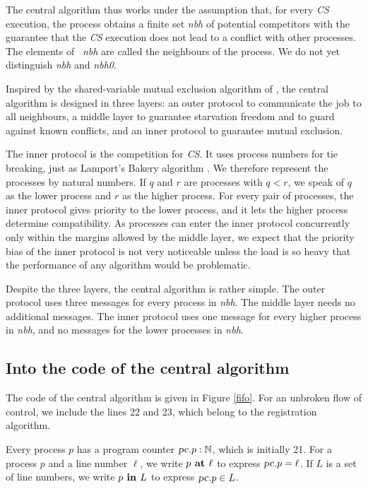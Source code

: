 \documentclass[10pt]{article} \usepackage[english]{babel}
\def\Nat   {\mbox{$\mathbb{N}$}}
\def\S #1/{\mbox {\textsl{#1}}}
\def\B #1/{\mbox {\textbf{#1}}}
\begin{document}
The central algorithm thus works under the assumption that, for every
\S CS/ execution, the process obtains a finite set \S nbh/ of
potential competitors with the guarantee that the \S CS/ execution
does not lead to a conflict with other processes.  The elements of \S
nbh/ are called the neighbours of the process.  We do not yet
distinguish \S nbh/ and \S nbh0/.

Inspired by the shared-variable mutual exclusion algorithm of
\cite{LyH91}, the central algorithm is designed in three layers: an
outer protocol to communicate the job to all neighbours, a middle
layer to guarantee starvation freedom and to guard against known
conflicts, and an inner protocol to guarantee mutual exclusion.

The inner protocol is the competition for \S CS/.  It uses process
numbers for tie breaking, just as Lamport's Bakery algorithm
\cite{Lam74}. We therefore represent the processes by natural
numbers. If $q$ and $r$ are processes with $q<r$, we speak of $q$ as
the lower process and $r$ as the higher process.  For every pair of
processes, the inner protocol gives priority to the lower process, and
it lets the higher process determine compatibility.  As processes can
enter the inner protocol concurrently only within the margins allowed
by the middle layer, we expect that the priority bias of the inner
protocol is not very noticeable unless the load is so heavy that the
performance of any algorithm would be problematic.

Despite the three layers, the central algorithm is rather simple.  The
outer protocol uses three messages for every process in \S nbh/.  The
middle layer needs no additional messages.  The inner protocol uses
one message for every higher process in \S nbh/, and no messages for
the lower processes in \S nbh/.

\subsection{Into the code of the central algorithm} \label{code}

The code of the central algorithm is given in Figure \ref{fifo}.  For
an unbroken flow of control, we include the lines 22 and 23, which
belong to the registration algorithm.

Every process $p$ has a program counter $\S pc/.p:\Nat$, which is
initially 21.  For a process $p$ and a line number $\ell$, we write
$p\B\ at / \ell$ to express $\S pc/.p = \ell$. If $L$ is a set of line
numbers, we write $p\B\ in / L$ to express $\S pc/.p \in L$.
\end{document}
